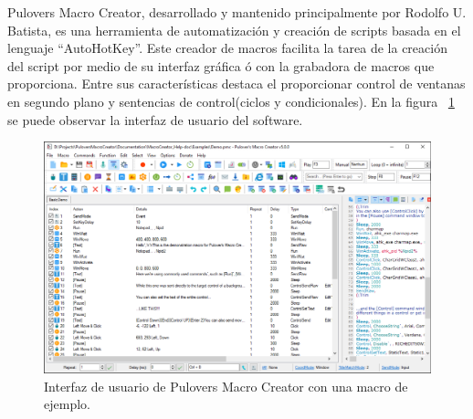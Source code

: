 
Pulover\textsc{}s Macro Creator\cite{Batista}, desarrollado y mantenido
 principalmente por Rodolfo U. Batista, es una herramienta de automatizaci\'on
 y creaci\'on de scripts basada en el lenguaje ``AutoHotKey''. Este creador de
 macros facilita la tarea de la creaci\'on del script por medio de su interfaz
 gr\'afica \'o con la grabadora de macros que proporciona. Entre sus
 caracter\'isticas destaca el proporcionar control de ventanas en segundo plano
 y sentencias de control(ciclos y condicionales). En la figura
 ~\ref{fig:macros} se puede observar la interfaz de usuario del software.


\begin{figure}[h]
\centering
\includegraphics[width=0.7\columnwidth]{chap2/Imagenes/Macros.eps}
\caption{Interfaz de usuario de Pulovers Macro Creator con una macro de
 ejemplo.}
\label{fig:macros}
\end{figure}